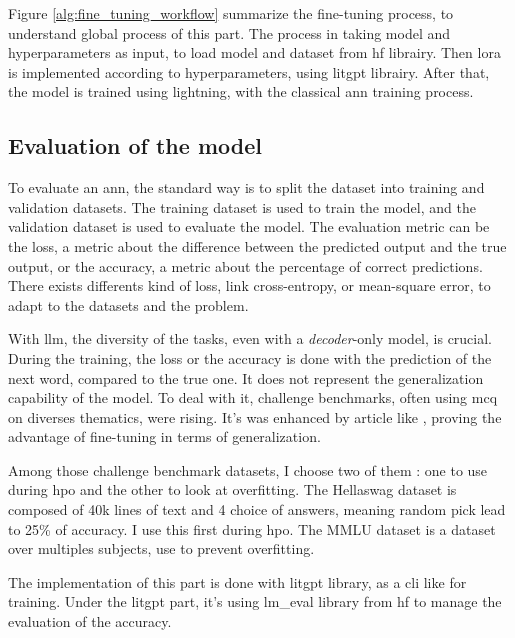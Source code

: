 Figure \ref{alg:fine_tuning_workflow} summarize the fine-tuning process, to understand global process of this part. The process in taking model and hyperparameters as input, to load model and dataset from \gls{hf} librairy. Then \acrshort{lora} is implemented according to hyperparameters, using \gls{litgpt} librairy. After that, the model is trained using \gls{lightning}, with the classical \acrshort{ann} training process. 


\subsection{Evaluation of the model}
\label{sec:model_evaluation}

To evaluate an \acrshort{ann}, the standard way is to split the dataset into training and validation datasets. The training dataset is used to train the model, and the validation dataset is used to evaluate the model. The evaluation metric can be the loss, a metric about the difference between the predicted output and the true output, or the accuracy, a metric about the percentage of correct predictions. There exists differents kind of loss, link cross-entropy, or mean-square error, to adapt to the datasets and the problem.

With \acrshort{llm}, the diversity of the tasks, even with a \textit{decoder}-only model, is crucial. During the training, the loss or the accuracy is done with the prediction of the next word, compared to the true one. It does not represent the generalization capability of the model. To deal with it, challenge benchmarks, often using \acrfull{mcq} on diverses thematics, were rising. It's was enhanced by article like \cite{wei_finetuned_2022}, proving the advantage of fine-tuning in terms of generalization. 

Among those challenge benchmark datasets, I choose two of them : one to use during \acrshort{hpo} and the other to look at overfitting. The Hellaswag \cite{zellers_hellaswag_2019} dataset is composed of 40k lines of text and 4 choice of answers, meaning random pick lead to 25\% of accuracy. I use this first during \acrshort{hpo}. The MMLU dataset \cite{hendrycks_measuring_2021} is a dataset over multiples subjects, use to prevent overfitting.

The implementation of this part is done with \gls{litgpt} library, as a \acrshort{cli} like for training. Under the \gls{litgpt} part, it's using lm\_eval library from \gls{hf} to manage the evaluation of the accuracy. 



